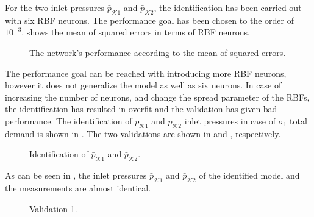 For the two inlet pressures $\bar{p}_{\mathcal{K}1}$ and $\bar{p}_{\mathcal{K}2}$, the identification has been carried out with six RBF neurons. The performance goal has been chosen to the order of $10^{-3}$.  shows the mean of squared errors in terms of RBF neurons. 

 \begin{figure}[H]
 \centering
  
 \vspace{-2.5mm}
 \caption{The network’s performance according to the mean of squared errors.}
 \label{fig:MSE_output}
 \end{figure}

 \vspace{-4mm}

The performance goal can be reached with introducing more RBF neurons, however it does not generalize the model as well as six neurons. In case of increasing the number of neurons, and change the spread parameter of the RBFs, the identification has resulted in overfit and the validation has given bad performance. The identification of $\bar{p}_{\mathcal{K}1}$ and $\bar{p}_{\mathcal{K}2}$ inlet pressures in case of $\sigma_1$ total demand is shown in . The two validations are shown in   and , respectively. 

 \begin{figure}[H]
 \centering
  
 \vspace{-2.5mm}
 \caption{Identification of $\bar{p}_{\mathcal{K}1}$ and $\bar{p}_{\mathcal{K}2}$.}
 \label{fig:pk_ident}
 \end{figure}

 \vspace{-4mm}

 As can be seen in , the inlet pressures $\bar{p}_{\mathcal{K}1}$ and $\bar{p}_{\mathcal{K}2}$ of the identified model and the measurements are almost identical. 

 \vspace{-2mm}

 \begin{figure}[H]
 \centering
  
 \vspace{-2.5mm}
 \caption{Validation 1.}
 \label{fig:pk_v1_ident}
 \end{figure}

